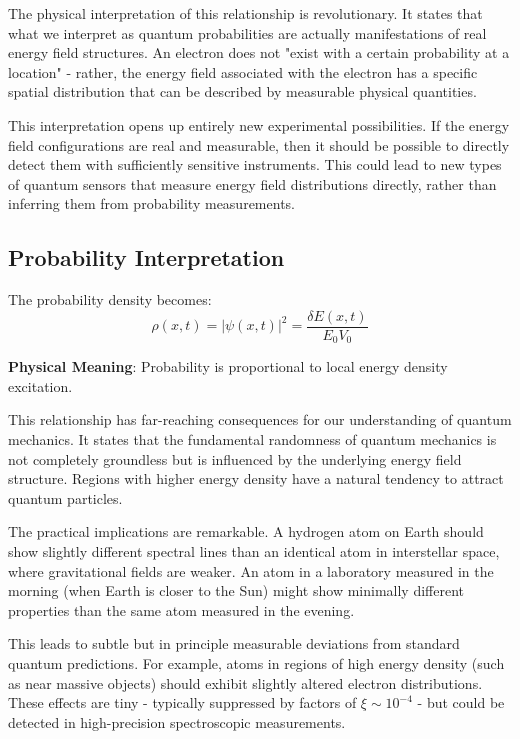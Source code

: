 \documentclass[12pt,a4paper]{article}
\newcommand{\deltaE}{\delta E}
\newcommand{\xipar}{\xi}
\theoremstyle{definition}
\theoremstyle{remark}
\begin{document}
The physical interpretation of this relationship is revolutionary. It states that what we interpret as quantum probabilities are actually manifestations of real energy field structures. An electron does not "exist with a certain probability at a location" - rather, the energy field associated with the electron has a specific spatial distribution that can be described by measurable physical quantities.

This interpretation opens up entirely new experimental possibilities. If the energy field configurations are real and measurable, then it should be possible to directly detect them with sufficiently sensitive instruments. This could lead to new types of quantum sensors that measure energy field distributions directly, rather than inferring them from probability measurements.

\subsection{Probability Interpretation}

The probability density becomes:
\begin{equation}
	\rho(x,t) = |\psi(x,t)|^2 = \frac{\deltaE(x,t)}{E_0 V_0}
	\label{eq:probability_density}
\end{equation}

\textbf{Physical Meaning}: Probability is proportional to local energy density excitation.

This relationship has far-reaching consequences for our understanding of quantum mechanics. It states that the fundamental randomness of quantum mechanics is not completely groundless but is influenced by the underlying energy field structure. Regions with higher energy density have a natural tendency to attract quantum particles.

The practical implications are remarkable. A hydrogen atom on Earth should show slightly different spectral lines than an identical atom in interstellar space, where gravitational fields are weaker. An atom in a laboratory measured in the morning (when Earth is closer to the Sun) might show minimally different properties than the same atom measured in the evening.

This leads to subtle but in principle measurable deviations from standard quantum predictions. For example, atoms in regions of high energy density (such as near massive objects) should exhibit slightly altered electron distributions. These effects are tiny - typically suppressed by factors of $\xipar \sim 10^{-4}$ - but could be detected in high-precision spectroscopic measurements.
\end{document}
